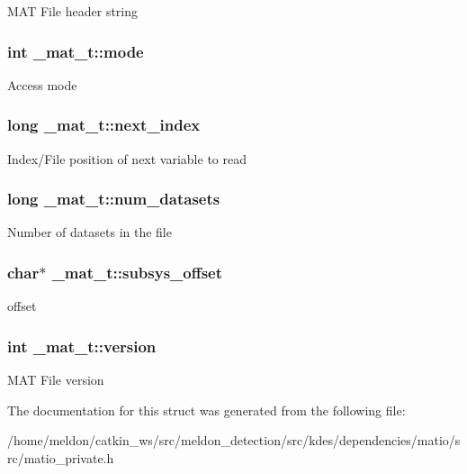 M\-A\-T File header string \hypertarget{struct__mat__t_aa43288b63b8edb7cadf0b79e2d1df2ee}{
\subsubsection[{mode}]{\setlength{\rightskip}{0pt plus 5cm}int \-\_\-mat\-\_\-t\-::mode}}\label{struct__mat__t_aa43288b63b8edb7cadf0b79e2d1df2ee}
Access mode \hypertarget{struct__mat__t_ab673fe0b330cf4666a66924e37d908d8}{
\subsubsection[{next\-\_\-index}]{\setlength{\rightskip}{0pt plus 5cm}long \-\_\-mat\-\_\-t\-::next\-\_\-index}}\label{struct__mat__t_ab673fe0b330cf4666a66924e37d908d8}
Index/\-File position of next variable to read \hypertarget{struct__mat__t_afa714cbc14c9846e8e62df7cae0a9181}{
\subsubsection[{num\-\_\-datasets}]{\setlength{\rightskip}{0pt plus 5cm}long \-\_\-mat\-\_\-t\-::num\-\_\-datasets}}\label{struct__mat__t_afa714cbc14c9846e8e62df7cae0a9181}
Number of datasets in the file \hypertarget{struct__mat__t_a19317c01209959d755d69311960d3eec}{
\subsubsection[{subsys\-\_\-offset}]{\setlength{\rightskip}{0pt plus 5cm}char$\ast$ \-\_\-mat\-\_\-t\-::subsys\-\_\-offset}}\label{struct__mat__t_a19317c01209959d755d69311960d3eec}
offset \hypertarget{struct__mat__t_a729c2bc0afc97485057a5af425635b1a}{
\subsubsection[{version}]{\setlength{\rightskip}{0pt plus 5cm}int \-\_\-mat\-\_\-t\-::version}}\label{struct__mat__t_a729c2bc0afc97485057a5af425635b1a}
M\-A\-T File version 

The documentation for this struct was generated from the following file\-:\begin{DoxyCompactItemize}
\item 
/home/meldon/catkin\-\_\-ws/src/meldon\-\_\-detection/src/kdes/dependencies/matio/src/matio\-\_\-private.\-h\end{DoxyCompactItemize}
